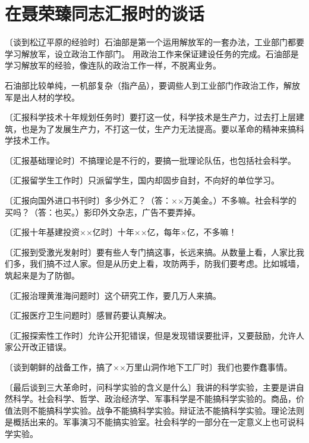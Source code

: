 \section[在聂荣臻同志汇报时的谈话（一九六三年十二月）]{在聂荣臻同志汇报时的谈话}


〔谈到松辽平原的经验时〕石油部是第一个运用解放军的一套办法，工业部门都要学习解放军，设立政治工作部门。
用政治工作来保证建设任务的完成。石油部是学习解放军的经验，像连队的政治工作一样，不脱离业务。

石油部比较单纯，一机部复杂（指产品），要调些人到工业部门作政治工作，解放军是出人材的学校。

〔汇报科学技术十年规划任务时〕要打这一仗，科学技术是生产力，过去打上层建筑，也是为了发展生产力，不打这一仗，生产力无法提高。要以革命的精神来搞科学技术工作。

〔汇报基础理论时〕不搞理论是不行的，要搞一批理论队伍，也包括社会科学。

〔汇报留学生工作时〕只派留学生，国内却固步自封，不向好的单位学习。

〔汇报向国外进口书刊时〕多少外汇？（答：××万美金。）不多嘛。社会科学的买吗？（答：也买。）影印外文杂志，广告不要弄掉。

〔汇报十年基建投资××亿时〕十年××亿，每年×亿，不多嘛！

〔汇报到受激光发射时〕要有些人专门搞这事，长远来搞。从数量上看，人家比我们多，我们搞不过人家。但是从历史上看，攻防两手，防我们要考虑。比如城墙，筑起来是为了防御。

〔汇报治理黄淮海问题时〕这个研究工作，要几万人来搞。

〔汇报医疗卫生问题时〕感冒药要认真解决。

〔汇报探索性工作时〕允许公开犯错误，但是发现错误要批评，又要鼓励，允许人家公开改正错误。

〔谈到朝鲜的战备工作，搞了××万里山洞作地下工厂时〕我们也要作蠢事情。

〔最后谈到三大革命时，问科学实验的含义是什么〕我讲的科学实验，主要是讲自然科学。社会科学、哲学、政治经济学、军事科学是不能搞科学实验的。商品，价值法则不能搞科学实验。战争不能搞科学实验。辩证法不能搞科学实验。理论法则是概括出来的。军事演习不能搞实验室。社会科学的一部分在一定意义上也可说科学实验。

